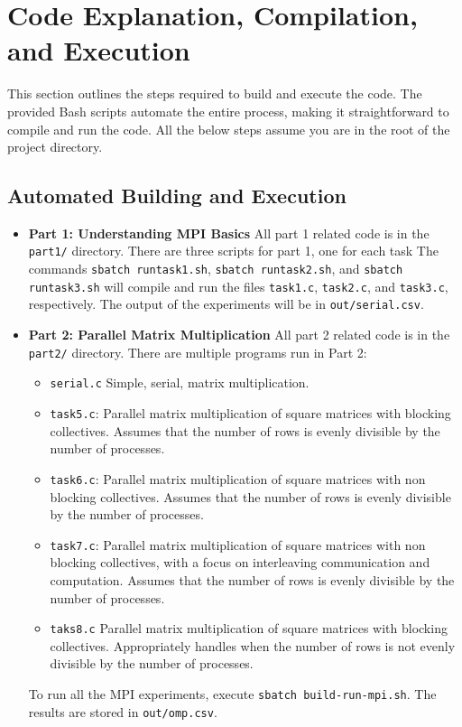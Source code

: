 \documentclass{article}
\begin{document}
\section{Code Explanation, Compilation, and Execution}

This section outlines the steps required to build and execute the code. The provided Bash scripts automate the entire process, 
making it straightforward to compile and run the code. All the below steps assume 
you are in the root of the project directory.

\subsection{Automated Building and Execution}
\begin{itemize}
    \item \textbf{Part 1: Understanding MPI Basics} 
    All part 1 related code is in the \texttt{part1/} directory.
    There are three scripts for part 1, one for each task
    The commands \texttt{sbatch runtask1.sh}, \texttt{sbatch runtask2.sh}, 
    and \texttt{sbatch runtask3.sh} will compile and run the files 
    \texttt{task1.c}, \texttt{task2.c}, and \texttt{task3.c}, respectively.
    The output of the experiments will be in \texttt{out/serial.csv}.
    
    \item \textbf{Part 2: Parallel Matrix Multiplication}
    All part 2 related code is in the \texttt{part2/} directory.
    There are multiple programs run in Part 2: 
    \begin{itemize}
        \item \texttt{serial.c} Simple, serial, matrix multiplication.
        \item \texttt{task5.c}: Parallel matrix multiplication of square matrices with blocking collectives. 
        Assumes that the number of rows is evenly divisible by the number of processes.
        \item \texttt{task6.c}: Parallel matrix multiplication of square matrices with non blocking collectives. 
        Assumes that the number of rows is evenly divisible by the number of processes.
        \item \texttt{task7.c}:  Parallel matrix multiplication of square matrices with non blocking collectives, 
        with a focus on interleaving communication and computation. Assumes that the number of rows is evenly divisible by the number of processes.
        \item \texttt{taks8.c} Parallel matrix multiplication of square matrices with blocking collectives. 
        Appropriately handles when the number of rows is not evenly divisible by the number of processes.
    \end{itemize}
    To run all the MPI experiments, execute \texttt{sbatch build-run-mpi.sh}. The results are stored in 
    \texttt{out/omp.csv}.
\end{itemize}
\end{document}
